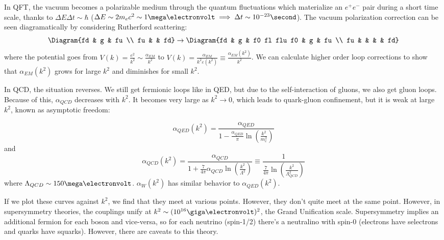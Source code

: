 \documentclass[a4paper,twoside,master.tex]{subfiles}
\begin{document}
In QFT, the vacuum becomes a polarizable medium through the quantum fluctuations which materialize an $ e^+ e^- $ pair during a short time scale, thanks to $ \Delta E \Delta t \sim \hbar $ ($ \Delta E \sim 2 m_e c^2 \sim 1 \mega\electronvolt \implies \Delta t \sim 10^{-23} \second $). The vacuum polarization correction can be seen diagramatically by considering Rutherford scattering:
\begin{equation}
    \Diagram{fd & g & fu \\ fu & & fd} \to \Diagram{fd & g & f0 fl flu f0 & g & fu \\ fu & & & & fd}
\end{equation}
where the potential goes from $ V(k) = \frac{e^2}{k^2} \sim \frac{\alpha_{EM}}{k^2} $ to $ V(k) = \frac{\alpha_{EM}}{k^2 \varepsilon(k^2)} \equiv \frac{\alpha_{EM}(k^2)}{k^2} $. We can calculate higher order loop corrections to show that $ \alpha_{EM}(k^2) $ grows for large $ k^2 $ and diminishes for small $ k^2 $.

In QCD, the situation reverses. We still get fermionic loops like in QED, but due to the self-interaction of gluons, we also get gluon loops. Because of this, $ \alpha_{QCD} $ decreases with $ k^2 $. It becomes very large as $ k^2 \to 0 $, which leads to quark-gluon confinement, but it is weak at large $ k^2 $, known as asymptotic freedom:

\begin{equation}
    \alpha_{QED}(k^2) = \frac{\alpha_{QED}}{1 - \frac{\alpha_{QED}}{\pi} \ln(\frac{k^2}{m_e^2})}
\end{equation}
and
\begin{equation}
    \alpha_{QCD}(k^2) = \frac{\alpha_{QCD}}{1 + \frac{7}{4 \pi} \alpha_{QCD} \ln(\frac{k^2}{\Lambda^2})} \equiv \frac{1}{\frac{7}{4 \pi} \ln(\frac{k^2}{\Lambda^2_{QCD}})}
\end{equation}
where $ \Lambda_{QCD} \sim 150 \mega\electronvolt $. $ \alpha_W(k^2) $ has similar behavior to $ \alpha_{QED}(k^2) $.

If we plot these curves against $ k^2 $, we find that they meet at various points. However, they don't quite meet at the same point. However, in supersymmetry theories, the couplings unify at $ k^2 \sim (10^{16} \giga\electronvolt)^2 $, the Grand Unification scale. Supersymmetry implies an additional fermion for each boson and vice-versa, so for each neutrino (spin-1/2) there's a neutralino with spin-0 (electrons have selectrons and quarks have squarks). However, there are caveats to this theory.
\end{document}
